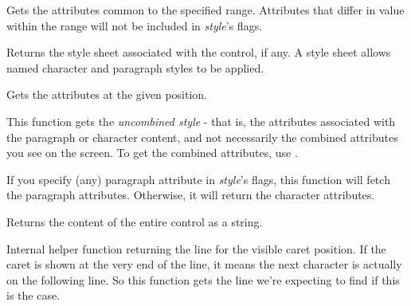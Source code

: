 \label{wxrichtextctrlgetstyleforrange}


Gets the attributes common to the specified range. Attributes that differ in value within the range will
not be included in {\it style}'s flags.

\label{wxrichtextctrlgetstylesheet}


Returns the style sheet associated with the control, if any. A style sheet allows named
character and paragraph styles to be applied.

\label{wxrichtextctrlgetuncombinedstyle}


Gets the attributes at the given position.

This function gets the {\it uncombined style} - that is, the attributes associated with the
paragraph or character content, and not necessarily the combined attributes you see on the
screen. To get the combined attributes, use .

If you specify (any) paragraph attribute in {\it style}'s flags, this function will fetch
the paragraph attributes. Otherwise, it will return the character attributes.

\label{wxrichtextctrlgetvalue}


Returns the content of the entire control as a string.

\label{wxrichtextctrlgetvisiblelineforcaretposition}


Internal helper function returning the line for the visible caret position. If the caret is
shown at the very end of the line, it means the next character is actually
on the following line. So this function gets the line we're expecting to find
if this is the case.

\label{wxrichtextctrlhascharacterattributes}

